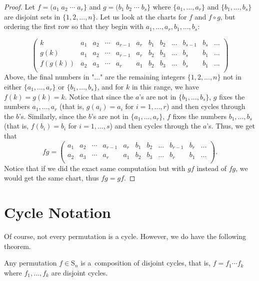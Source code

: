 \documentclass[11pt,dvipsnames]{book}
\numberwithin{figure}{section} %
\numberwithin{table}{section} %
\begin{document}
\begin{proof}
Let $f=(a_{1}\; a_{2}\; \cdots \; a_{r}\}$ and $g=(b_{1}\; b_{2}\; \cdots \; b_{s}\}$ where $\{a_{1},...,a_{r}\}$ and $\{b_{1},...,b_{s}\}$ are disjoint sets in $\{1,2,...,n\}$. Let us look at the charts for $f$ and $f\circ g$, but ordering the first row so that they begin with $a_{1},...,a_{r},b_{1},...,b_{s}$:

\[
 \left(\begin{array}{c|ccccccccccc} %
k & a_1 & a_2 & \cdots  &  a_{r-1} &  a_r & b_{1} & b_{2} & ...  & b_{s-1} &  b_{s} & ... \\  %
g(k) & a_1 & a_2 & \cdots  &  a_{r-1} &  a_r & b_{2} & b_{3} & ...  & b_{s} &  b_{1} & ... \\  %
f(g(k)) & a_2 & a_3 & \cdots  &  a_{r} &  a_1 & b_{2} & b_{3} & ...  & b_{s} &  b_{1} & ... \\  %
\end{array}\right)
\]
Above, the final numbers in "$...$" are the remaining integers $\{1,2,...,n\}$ not in either $\{a_{1},...,a_{r}\}$ or $\{b_{1},...,b_{s}\}$, and for $k$ in this range, we have $f(k)=g(k)=k$. Notice that since the $a$'s are not in  $\{b_{1},...,b_{s}\}$, $g$ fixes the numbers $a_{1},...,a_{r}$ (that is, $g(a_{i})=a_{i}$ for $i=1,...,r$) and then cycles through the $b$'s. Similarly,  since the $b$'s are not in  $\{a_{1},...,a_{r}\}$, $f$ fixes the numbers $b_{1},...,b_{s}$ (that is, $f(b_{i})=b_{i}$ for $i=1,...,s$) and then cycles through the $a$'s. Thus, we get that
\[
fg=  \left(\begin{array}{c|cccccccccc} %
 a_1 & a_2 & \cdots  &  a_{r-1} &  a_r & b_{1} & b_{2} & ...  & b_{r-1} &  b_{r} & ... \\  %
 a_2 & a_3 & \cdots  &  a_{r} &  a_1 & b_{2} & b_{3} & ...  & b_{r} &  b_{1} & ... \\  %
\end{array}\right).
\]
Notice that if we did the exact same computation but with $gf$ instead of $fg$, we would get the same chart, thus $fg=gf$. 

\end{proof}


\section{Cycle Notation}
Of course, not every permutation is a cycle. However, we do have the following theorem.

\begin{theorem}%
Any permutation $f\in \mathrm{S}_{n}$ is a~composition of disjoint
cycles, that is, $f=f_{1}\cdots f_{k}$ where $f_{1},...,f_{k}$ are disjoint cycles.
\end{theorem}
\end{document}
